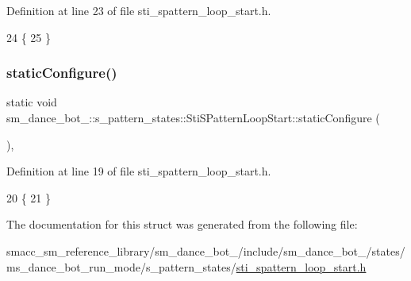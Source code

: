 Definition at line 23 of file sti\+\_\+spattern\+\_\+loop\+\_\+start.\+h.


\begin{DoxyCode}
24   \{
25   \}
\end{DoxyCode}
\mbox{\label{structsm__dance__bot__2_1_1s__pattern__states_1_1StiSPatternLoopStart_abd602ceaaa7c89b2970d8e6b5b7d2273}} 
\subsubsection{\texorpdfstring{static\+Configure()}{staticConfigure()}}
{\footnotesize\ttfamily static void sm\+\_\+dance\+\_\+bot\+\_\+::s\+\_\+pattern\+\_\+states\+::\+Sti\+S\+Pattern\+Loop\+Start\+::static\+Configure (\begin{DoxyParamCaption}{ }\end{DoxyParamCaption})\hspace{0.3cm}{\ttfamily [inline]}, {\ttfamily [static]}}



Definition at line 19 of file sti\+\_\+spattern\+\_\+loop\+\_\+start.\+h.


\begin{DoxyCode}
20   \{
21   \}
\end{DoxyCode}


The documentation for this struct was generated from the following file\+:\begin{DoxyCompactItemize}
\item 
smacc\+\_\+sm\+\_\+reference\+\_\+library/sm\+\_\+dance\+\_\+bot\+\_/include/sm\+\_\+dance\+\_\+bot\+\_/states/ms\+\_\+dance\+\_\+bot\+\_\+run\+\_\+mode/s\+\_\+pattern\+\_\+states/\hyperlink{2_2include_2sm__dance__bot__2_2states_2ms__dance__bot__run__mode_2s__pattern__states_2sti__spattern__loop__start_8h}{sti\+\_\+spattern\+\_\+loop\+\_\+start.\+h}\end{DoxyCompactItemize}
